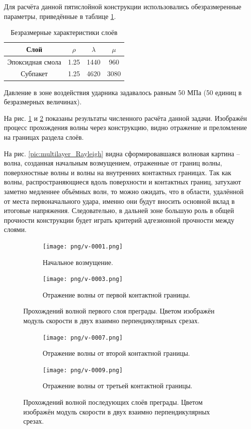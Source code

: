 Для расчёта данной пятислойной конструкции использовались обезразмеренные параметры, приведённые в таблице \ref{tbl:subpackage_2}.
\begin{table}[h]
\centering
\caption{Безразмерные характеристики слоёв}
\begin{tabular}{|c|c|c|c|}
\hline
Слой & $\rho$ & $\lambda$ & $\mu$  \\
\hline
Эпоксидная смола & 1.25 & 1440 & 960 \\
Субпакет & 1.25 & 4620 & 3080 \\
\hline
\end{tabular}
\label{tbl:subpackage_2}
\end{table}

Давление в зоне воздействия ударника задавалось равным 50 МПа (50 единиц в безразмерных величинах).

На рис. \ref{pic:multilayer_3d_1} и \ref{pic:multilayer_3d_2} показаны результаты численного расчёта данной задачи. Изображён процесс прохождения волны через конструкцию, видно отражение и преломление на границах раздела слоёв.

На рис. \ref{pic:multilayer_Rayleigh} видна сформировавшаяся волновая картина -- волна, созданная начальным возмущением, отраженные от границ волны, поверхностные волны и волны на внутренних контактных границах. Так как волны, распространяющиеся вдоль поверхности и контактных границ, затухают заметно медленнее объёмных волн, то можно ожидать, что в области, удалённой от места первоначального удара, именно они будут вносить основной вклад в итоговые напряжения. Следовательно, в дальней зоне большую роль в общей прочности конструкции будет играть критерий адгезионной прочности между слоями.


\begin{figure}[h]
\begin{subfigure}[b]{\textwidth}
\centering
\texttt{[image: png/v-0001.png]}
\caption{Начальное возмущение.}
\end{subfigure}
\begin{subfigure}[b]{\textwidth}
\centering
\texttt{[image: png/v-0003.png]}
\caption{Отражение волны от первой контактной границы.}
\end{subfigure}
\caption{Прохождений волной первого слоя преграды. Цветом изображён модуль скорости в
двух взаимно перпендикулярных срезах.}
\label{pic:multilayer_3d_1}
\end{figure}


\begin{figure}[htp]
\begin{subfigure}[b]{\textwidth}
\centering
\texttt{[image: png/v-0007.png]}
\caption{Отражение волны от второй контактной границы.}
\end{subfigure}
\begin{subfigure}[b]{\textwidth}
\centering
\texttt{[image: png/v-0009.png]}
\caption{Отражение волны от третьей контактной границы.}
\end{subfigure}
\caption{Прохождений волной последующих слоёв преграды. Цветом изображён модуль скорости в
двух взаимно перпендикулярных срезах.}
\label{pic:multilayer_3d_2}
\end{figure}


